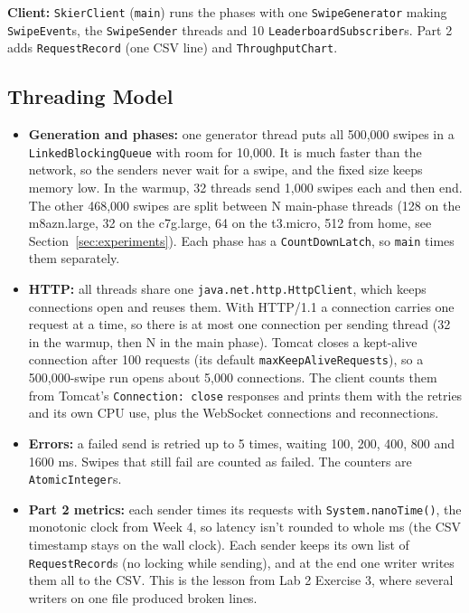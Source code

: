 \documentclass[10pt]{article}
\begin{document}
\textbf{Client:} \texttt{SkierClient} (\texttt{main}) runs the phases with one \texttt{SwipeGenerator} making \texttt{SwipeEvent}s, the \texttt{SwipeSender} threads and 10 \texttt{LeaderboardSubscriber}s. Part 2 adds \texttt{RequestRecord} (one CSV line) and \texttt{ThroughputChart}.

\subsection{Threading Model}
\begin{itemize}
  \item \textbf{Generation and phases:} one generator thread puts all 500,000 swipes in a \texttt{LinkedBlockingQueue} with room for 10,000. It is much faster than the network, so the senders never wait for a swipe, and the fixed size keeps memory low. In the warmup, 32 threads send 1,000 swipes each and then end. The other 468,000 swipes are split between N main-phase threads (128 on the m8azn.large, 32 on the c7g.large, 64 on the t3.micro, 512 from home, see Section~\ref{sec:experiments}). Each phase has a \texttt{CountDownLatch}, so \texttt{main} times them separately.
  \item \textbf{HTTP:} all threads share one \texttt{java.net.http.HttpClient}, which keeps connections open and reuses them. With HTTP/1.1 a connection carries one request at a time, so there is at most one connection per sending thread (32 in the warmup, then N in the main phase). Tomcat closes a kept-alive connection after 100 requests (its default \texttt{maxKeepAliveRequests}), so a 500,000-swipe run opens about 5,000 connections. The client counts them from Tomcat's \texttt{Connection: close} responses and prints them with the retries and its own CPU use, plus the WebSocket connections and reconnections.
  \item \textbf{Errors:} a failed send is retried up to 5 times, waiting 100, 200, 400, 800 and 1600 ms. Swipes that still fail are counted as failed. The counters are \texttt{AtomicInteger}s.
  \item \textbf{Part 2 metrics:} each sender times its requests with \texttt{System.nanoTime()}, the monotonic clock from Week 4, so latency isn't rounded to whole ms (the CSV timestamp stays on the wall clock). Each sender keeps its own list of \texttt{RequestRecord}s (no locking while sending), and at the end one writer writes them all to the CSV. This is the lesson from Lab 2 Exercise 3, where several writers on one file produced broken lines.
\end{itemize}
\end{document}
